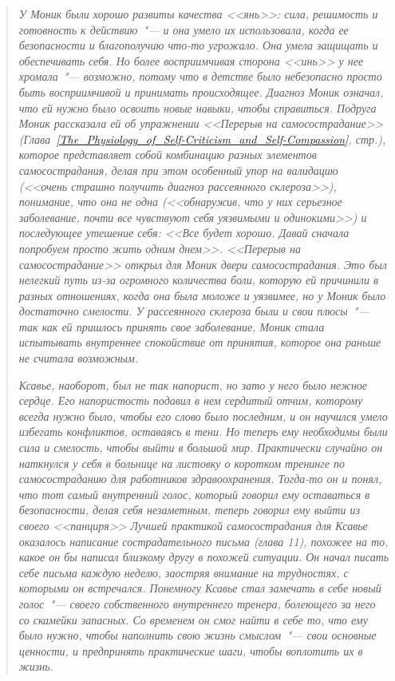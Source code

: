 \begin{quotation}
	\textit{У Моник были хорошо развиты качества <<янь>>: сила, решимость и готовность к действию~"--- и она умело их использовала, когда ее безопасности и благополучию что-то угрожало. Она умела защищать и обеспечивать себя. Но более восприимчивая сторона <<инь>> у нее хромала~"--- возможно, потому что в детстве было небезопасно просто быть восприимчивой и принимать происходящее. Диагноз Моник означал, что ей нужно было освоить новые навыки, чтобы справиться. Подруга Моник рассказала ей об упражнении <<Перерыв на самосострадание>> (Глава~\ref{The_Physiology_of_Self-Criticism_and_Self-Compassion}, стр.\:\pageref{IP:Self-Compassion_Break}), которое представляет собой комбинацию разных элементов самосострадания, делая при этом особенный упор на валидацию (<<очень страшно получить диагноз рассеянного склероза>>), понимание, что она не одна (<<обнаружив, что у них серьезное заболевание, почти все чувствуют себя уязвимыми и одинокими>>) и последующее утешение себя: <<Все будет хорошо. Давай сначала попробуем просто жить одним днем>>. <<Перерыв на самосострадание>> открыл для Моник двери самосострадания. Это был нелегкий путь из-за огромного количества боли, которую ей причинили в разных отношениях, когда она была моложе и уязвимее, но у Моник было достаточно смелости. У рассеянного склероза были и свои плюсы~"--- так как ей пришлось принять свое заболевание, Моник стала испытывать внутреннее спокойствие от принятия, которое она раньше не считала возможным.}
		
	\textit{Ксавье, наоборот, был не так напорист, но зато у него было нежное сердце. Его напористость подавил в нем сердитый отчим, которому всегда нужно было, чтобы его слово было последним, и он научился умело избегать конфликтов, оставаясь в тени. Но теперь ему необходимы были сила и смелость, чтобы выйти в большой мир. Практически случайно он наткнулся у себя в больнице на листовку о коротком тренинге по самосостраданию для работников здравоохранения. Тогда-то он и понял, что тот самый внутренний голос, который говорил ему оставаться в безопасности, делая себя незаметным, теперь говорил ему выйти из своего <<панциря>> Лучшей практикой самосострадания для Ксавье оказалось написание сострадательного письма (глава 11), похожее на то, какое он бы написал близкому другу в похожей ситуации. Он начал писать себе письма каждую неделю, заостряя внимание на трудностях, с которыми он встречался. Понемногу Ксавье стал замечать в себе новый голос~"--- своего собственного внутреннего тренера, болеющего за него со скамейки запасных. Со временем он смог найти в себе то, что ему было нужно, чтобы наполнить свою жизнь смыслом~"--- свои основные ценности, и предпринять практические шаги, чтобы воплотить их в жизнь.}
\end{quotation}

